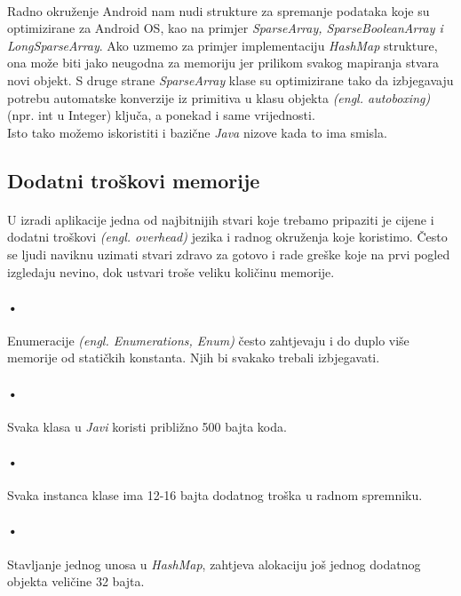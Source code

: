 \documentclass[times, utf8, zavrsni]{fer}
\begin{document}
\paragraph{}
Radno okruženje Android nam nudi strukture za spremanje podataka koje su optimizirane za Android OS, kao na primjer \textit{SparseArray, SparseBooleanArray i LongSparseArray}. Ako uzmemo za primjer implementaciju \textit{HashMap} strukture, ona može biti jako neugodna za memoriju jer prilikom svakog mapiranja stvara novi objekt. S druge strane \textit{SparseArray} klase su optimizirane tako da izbjegavaju potrebu automatske konverzije iz primitiva u klasu objekta \textit{(engl. autoboxing)}(npr. int u Integer) ključa, a ponekad i same vrijednosti.\\

Isto tako možemo iskoristiti i bazične \textit{Java} nizove kada to ima smisla.

\subsection{Dodatni troškovi memorije}
\paragraph{}
U izradi aplikacije jedna od najbitnijih stvari koje trebamo pripaziti je cijene i dodatni troškovi \textit{(engl. overhead)} jezika i radnog okruženja koje koristimo. Često se ljudi naviknu uzimati stvari zdravo za gotovo i rade greške koje na prvi pogled izgledaju nevino, dok ustvari troše veliku količinu memorije.

\paragraph{•}
Enumeracije \textit{(engl. Enumerations, Enum)} često zahtjevaju i do duplo više memorije od statičkih konstanta. Njih bi svakako trebali izbjegavati.

\paragraph{•}
Svaka klasa u \textit{Javi} koristi približno 500 bajta koda.

\paragraph{•}
Svaka instanca klase ima 12-16 bajta dodatnog troška u radnom spremniku.

\paragraph{•}
Stavljanje jednog unosa u \textit{HashMap}, zahtjeva alokaciju još jednog dodatnog objekta veličine 32 bajta.\\
\end{document}
